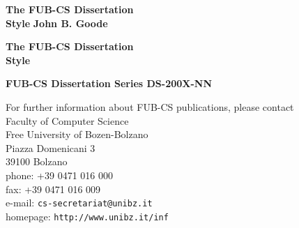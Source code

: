 {\pagestyle{empty}
\newcommand{\printtitle}{%
{\Huge\bf The FUB-CS Dissertation\\[0.8cm] Style}}    %

\begin{titlepage}
\par\vskip 2cm
\begin{center}
\printtitle
\vfill
{\LARGE\bf John B. Goode}                           %
\vskip 2cm
\end{center}
\end{titlepage}
%
%
\mbox{}\newpage
\setcounter{page}{1}

\par\vskip 2cm
\begin{center}
\printtitle
\end{center}

\clearpage
\par\vskip 2cm
\begin{center}
\par\vspace {1cm}
\fubcslogo{10cm}
\par\vspace {2cm}
\textbf{FUB-CS Dissertation Series DS-200X-NN}                 %
\par\vspace {5cm}
\noindent%
For further information about FUB-CS publications, please contact\\[2ex]
Faculty of Computer Science\\
Free University of Bozen-Bolzano\\
Piazza Domenicani 3\\
39100 Bolzano\\
phone: +39 0471 016 000\\
fax: +39 0471 016 009\\
e-mail: {\tt cs-secretariat@unibz.it}\\
homepage: {\tt http://www.unibz.it/inf}
\end{center}

}
